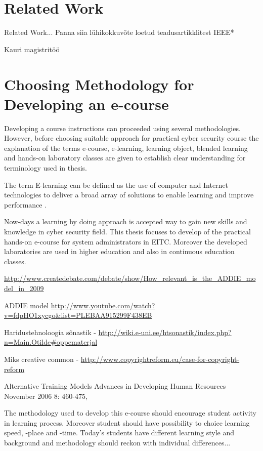 \section{Related Work}
\label{Related Work}
Related Work...
Panna siia lühikokkuvõte loetud teadusartikklitest IEEE*

Kauri magistritöö





\section{Choosing Methodology for Developing an e-course}

Developing a course instructions can proceeded using several methodologies. However, before choosing suitable approach for practical cyber security course the explanation of the terms e-course, e-learning, learning object, blended learning and hands-on laboratory classes are given to establish clear understanding for terminology used in thesis.

The term E-learning can be defined as the use of computer and Internet technologies to deliver a broad array of solutions to enable learning and improve performance \cite[p.~3]{food2011learning}.

Now-days a learning by doing approach is accepted way to gain new skills and knowledge in cyber security field. This thesis focuses to develop of the practical hands-on e-course for system administrators in \gls{EITC}. Moreover the developed laboratories are used in higher education and also in continuous education classes.



\url{http://www.createdebate.com/debate/show/How_relevant_is_the_ADDIE_model_in_2009}

ADDIE model \url{http://www.youtube.com/watch?v=fdpHO1xycgo&list=PLEBAA915299F438EB}


Haridustehnoloogia sõnastik - \url{http://wiki.e-uni.ee/htsonastik/index.php?n=Main.Otilde#oppematerjal}

Miks creative common - \url{http://www.copyrightreform.eu/case-for-copyright-reform}

Alternative Training Models
Advances in Developing Human Resources November 2006 8: 460-475,


The methodology used to develop this e-course should encourage student activity in learning process. Moreover student should have possibility to choice learning speed, -place and -time. Today's students have different learning style and background and methodology should reckon with individual differences...

